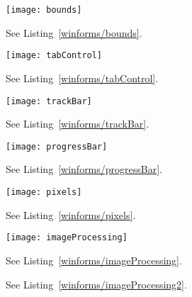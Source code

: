 %
%
\begin{figure}
  \centering
  \texttt{[image: bounds]}
  \caption{See Listing~\ref{winforms/bounds}.}
  \label{fig:bounds}
\end{figure}

%
%
\begin{figure}
  \centering
  \texttt{[image: tabControl]}
  \caption{See Listing~\ref{winforms/tabControl}.}
  \label{fig: tabControl}
\end{figure}

%
%
\begin{figure}
  \centering
  \texttt{[image: trackBar]}
  \caption{See Listing~\ref{winforms/trackBar}.}
  \label{fig: trackBar}
\end{figure}

%
%
\begin{figure}
  \centering
  \texttt{[image: progressBar]}
  \caption{See Listing~\ref{winforms/progressBar}.}
  \label{fig:bounds}
\end{figure}

%
%
\begin{figure}
  \centering
  \texttt{[image: pixels]}
  \caption{See Listing~\ref{winforms/pixels}.}
  \label{fig:pixels}
\end{figure}

%
%
\begin{figure}
  \centering
  \texttt{[image: imageProcessing]}
  \caption{See Listing~\ref{winforms/imageProcessing}.}
  \label{fig:imageProcessing}
\end{figure}
%
%
\begin{figure}
  \centering
  \caption{See Listing~\ref{winforms/imageProcessing2}.}
  \label{fig:imageProcessing2}
\end{figure}

